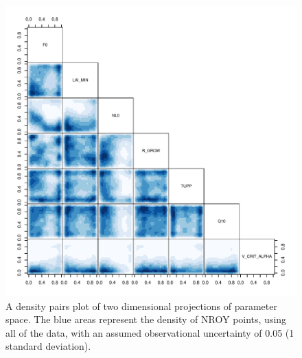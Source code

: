 \documentclass[esd, manuscript]{copernicus}
\begin{document}
\begin{figure}[t]
\includegraphics[width=12cm]{graphics/credible_NROY.pdf}
\caption{A density pairs plot of two dimensional projections of parameter space. The blue areas represent the density of NROY points, using all of the data, with an assumed observational uncertainty of 0.05 (1 standard deviation).}
\label{fig:credible_NROY}
\end{figure}
\end{document}
